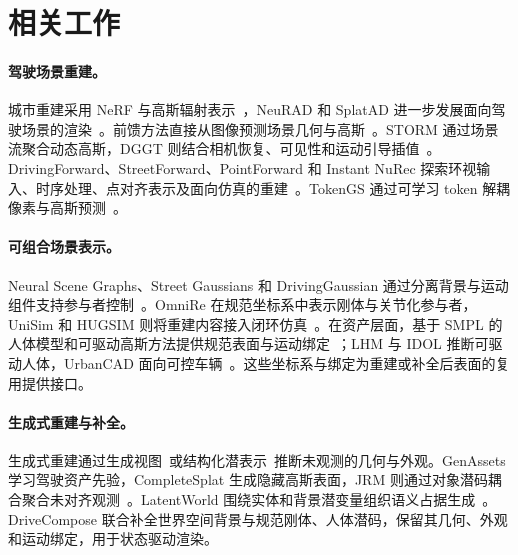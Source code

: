 \section{相关工作}
\label{sec:related}

\paragraph{驾驶场景重建。}
城市重建采用 NeRF 与高斯辐射表示~\cite{mildenhall2020nerf,kerbl2023gaussians}，NeuRAD 和 SplatAD 进一步发展面向驾驶场景的渲染~\cite{tonderski2024neurad,hess2025splatad}。前馈方法直接从图像预测场景几何与高斯~\cite{hong2024lrm,charatan2024pixelsplat,chen2024mvsplat,wang2024dust3r,wang2025vggt}。STORM 通过场景流聚合动态高斯，DGGT 则结合相机恢复、可见性和运动引导插值~\cite{yang2025storm,chen2025dggt}。DrivingForward、StreetForward、PointForward 和 Instant NuRec 探索环视输入、时序处理、点对齐表示及面向仿真的重建~\cite{tian2025drivingforward,yu2026streetforward,chi2026pointforward,huang2026instantnurec}。TokenGS 通过可学习 token 解耦像素与高斯预测~\cite{ren2026tokengs}。

\paragraph{可组合场景表示。}
Neural Scene Graphs、Street Gaussians 和 DrivingGaussian 通过分离背景与运动组件支持参与者控制~\cite{ost2021neuralgraphs,yan2024street,zhou2024drivinggaussian}。OmniRe 在规范坐标系中表示刚体与关节化参与者，UniSim 和 HUGSIM 则将重建内容接入闭环仿真~\cite{chen2025omnire,yang2023unisim,zhou2024hugsim}。在资产层面，基于 SMPL 的人体模型和可驱动高斯方法提供规范表面与运动绑定~\cite{loper2015smpl,pavlakos2019smplx,hu2024gauhuman,kocabas2024hugs,qian2024avatar}；LHM 与 IDOL 推断可驱动人体，UrbanCAD 面向可控车辆~\cite{qiu2025lhm,zhuang2025idol,lu2025urbancad}。这些坐标系与绑定为重建或补全后表面的复用提供接口。

\paragraph{生成式重建与补全。}
生成式重建通过生成视图~\cite{liu2023zero123,shi2024mvdream,gao2024cat3d}或结构化潜表示~\cite{xiang2025trellis,xiang2026trellis2}推断未观测的几何与外观。GenAssets 学习驾驶资产先验，CompleteSplat 生成隐藏高斯表面，JRM 则通过对象潜码耦合聚合未对齐观测~\cite{yang2025genassets,liao2025complete,wu2026jrm}。LatentWorld 围绕实体和背景潜变量组织语义占据生成~\cite{park2026latentworld}。DriveCompose 联合补全世界空间背景与规范刚体、人体潜码，保留其几何、外观和运动绑定，用于状态驱动渲染。

